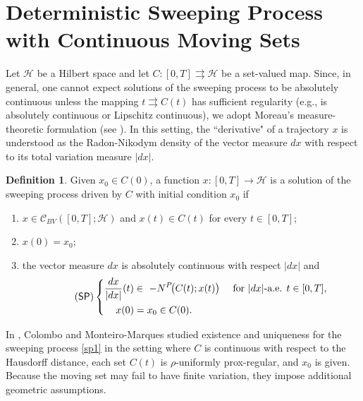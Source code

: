 \documentclass[preprint,12pt]{elsarticle}
\renewcommand{\H}{\mathcal{H}}
\newcommand{\tto}{\rightrightarrows}
\theoremstyle{plain}
\theoremstyle{definition}
\newtheorem{definition}[theorem]{Definition}
\theoremstyle{remark}
\begin{document}
\section{Deterministic Sweeping Process with Continuous Moving  Sets}\label{sec5}
Let $\mathcal H$ be a Hilbert space and let $C\colon [0,T]\rightrightarrows \mathcal H$ be a set-valued map. Since, in general, one cannot expect solutions of the sweeping process to be absolutely continuous unless the mapping $t\tto C(t)$ has sufficient regularity (e.g., is absolutely continuous or Lipschitz continuous), we adopt Moreau's measure-theoretic formulation (see \cite{MR508661}). In this setting, the ``derivative"  of a trajectory $x$ is understood as the Radon-Nikodym density of the vector measure $dx$ with respect to its total variation measure $\vert dx\vert$. 
\begin{definition}%
Given $x_0\in C(0)$, a function $x\colon [0,T]\to \H$ is a solution of the sweeping process driven by $C$ with initial condition $x_0$ if 
\begin{enumerate}
  \item[(i)] $x\in \mathcal{C}_{BV}([0,T];\H)$ and $x(t)\in C(t)$ for every $t\in[0,T]$;
  \item[(ii)] $x(0)=x_0$;
  \item[(iii)] the vector measure $dx$ is absolutely continuous with respect  $|dx|$ and
        \begin{equation}\tag{$\mathsf{SP}$}\label{sp1}
        \left\{
        \begin{aligned}
          \frac{dx}{|dx|}(t) &\in\ -N^{P}\!\big(C(t);x(t)\big)
          \quad\text{ for } |dx|\text{-a.e. } t\in[0,T],\\
          x(0)&=x_0\in C(0).
          \end{aligned} 
          \right.
        \end{equation}
\end{enumerate}
\end{definition}
    
In \cite{MR1946545}, Colombo and Monteiro-Marques studied existence and uniqueness for the sweeping process \eqref{sp1} in the setting where $C$ is continuous with respect to the Hausdorff distance, each set $C(t)$ is $\rho$-uniformly prox-regular, and $x_0$ is given. Because the moving set may fail to have finite variation, they impose additional geometric assumptions.
	
\end{document}
